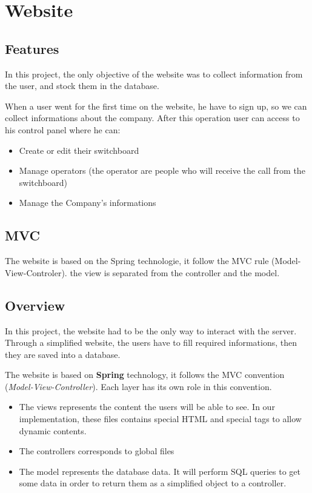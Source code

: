 \chapter{Website}
\section{Features}
In this project, the only objective of the website was to collect information from the user, and stock them in the database.

When a user went for the first time on the website, he have to sign up, so we can collect informations about the company. After this operation user can access to his control panel where he can:
\begin{itemize}  
\item Create or edit their switchboard
\item Manage operators (the operator are people who will receive the call from the switchboard)
\item Manage the Company's informations
\end{itemize}  



\section{MVC}
The website is based on the Spring technologie,  it follow the MVC rule (Model-View-Controler). the view is separated from the controller and the model.


\section{Overview}
In this project, the website had to be the only way to interact with the server. Through a simplified website, the users have to fill required informations, then they are saved into a database.
\newline

The website is based on \textbf{Spring} technology,  it follows the MVC convention (\textit{Model-View-Controller}). Each layer has its own role in this convention.


\begin{itemize}  
\item The views represents the content the users will be able to see. In our implementation, these files contains special HTML and special tags to allow dynamic contents. 
\item The controllers corresponds to global files 
\item The model represents the database data. It will perform SQL queries to get some data in order to return them as a simplified object to a controller.
\end{itemize}  

